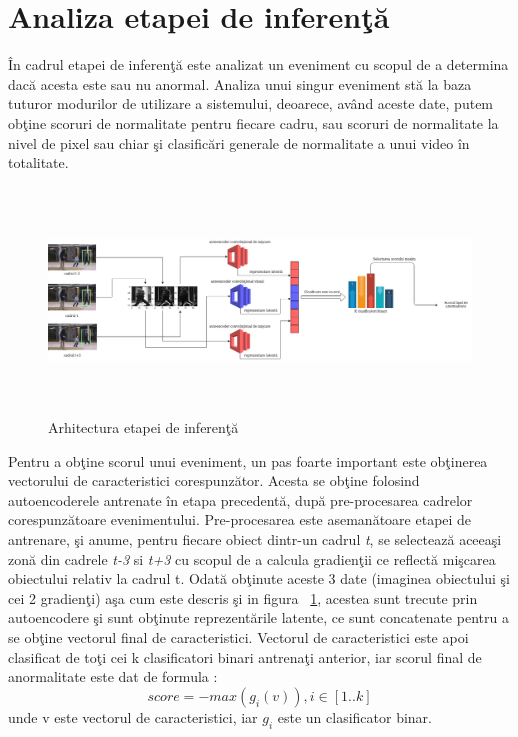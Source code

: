 \documentclass[a4paper,12pt]{report}
\begin{document}
\section{Analiza etapei de inferenţă}
În cadrul etapei de inferenţă este analizat un eveniment cu scopul de a determina dacă acesta este sau nu anormal. Analiza unui singur eveniment stă la baza tuturor modurilor de utilizare a sistemului, deoarece, având aceste date, putem obţine scoruri de normalitate pentru fiecare cadru, sau scoruri de normalitate la nivel de pixel sau chiar şi clasificări generale de normalitate a unui video în totalitate.

\begin{figure}[h]
\begin{center}
        \includegraphics[width=1\textwidth,height=6cm]{images/inference_architecture}
			 \caption{Arhitectura etapei de inferenţă}
			 \label{fig:inference_architecture}
\end{center}
\end{figure}
Pentru a obţine scorul unui eveniment, un pas foarte important este obţinerea vectorului de caracteristici corespunzător. Acesta se obţine folosind autoencoderele antrenate în etapa precedentă, după pre-procesarea cadrelor corespunzătoare evenimentului.  Pre-procesarea este asemanătoare etapei de antrenare, şi anume, pentru fiecare obiect dintr-un cadrul \emph{t}, se selectează aceeaşi zonă din cadrele \emph{t-3} si \emph{t+3} cu scopul de a calcula gradienţii ce reflectă mişcarea obiectului relativ la cadrul t. Odată obţinute aceste 3 date (imaginea obiectului şi cei 2 gradienţi) aşa cum este descris şi in figura
~\ref{fig:inference_architecture}, acestea sunt trecute prin autoencodere şi sunt obţinute reprezentările latente, ce sunt concatenate pentru a se obţine vectorul final de caracteristici. Vectorul de caracteristici este apoi clasificat de toţi cei k clasificatori binari antrenaţi anterior, iar scorul final de anormalitate este dat de formula : \[score = -max(g_{i}(v)), i \in [1..k]\] unde v este vectorul de caracteristici, iar \(g_{i}\) este un clasificator binar.
\end{document}
